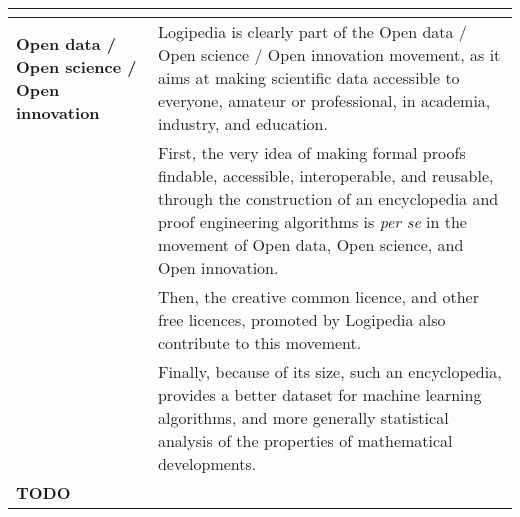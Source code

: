 \begin{longtable}{|p{}|p{}|}
\begin{compactitem}
\end{compactitem}
\\
\hline
{\bf Open data / Open science / Open innovation}
&
Logipedia is clearly part of the Open data / Open science / Open
innovation movement, as it aims at making scientific data accessible
to everyone, amateur or professional, in academia, industry, and
education.\\
&
\hspace{0.4cm}
First, the very idea of making formal proofs findable, accessible,
interoperable, and reusable, through the construction of an
encyclopedia and proof engineering algorithms is {\em per se} in the
movement of Open data, Open science, and Open innovation.\\
&
\hspace{0.4cm}
Then, the creative common licence, and other free licences, promoted by 
Logipedia also contribute to this movement.\\
&
\hspace{0.4cm}
Finally, because of its size, such an encyclopedia, provides a better
dataset for machine learning algorithms, and more generally
statistical analysis of the properties of mathematical developments.
\\
\hline
{\bf TODO}
&
\\
\hline
\end{longtable}

